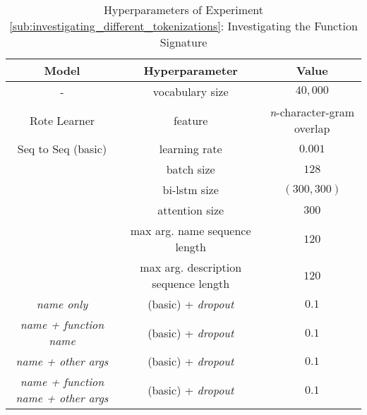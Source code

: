 \begin{table}[h!]
\begin{center}
\begin{tabular}{ c | c | c  }
    \textbf{Model}                           {}  & \textbf{Hyperparameter}  & \textbf{Value}    \\
    \hline
    -                                 & vocabulary size            & $40,000$ \\
    \hline
    Rote Learner                      & feature                    & \textit{n}-character-gram overlap \\
    \hline
    Seq to Seq  (basic)               & learning rate              & $0.001$         \\
                                      & batch size                 & $128$           \\
                                      & bi-lstm size               & $(300,300) $    \\
                                      & attention size             & $300$           \\
                                      & max arg. name sequence length         & $120$   \\
                                      & max arg. description sequence length  & $120$  \\
    \hdashline
    \textit{name only}              & (basic) + \textit{dropout}           & $0.1$           \\
    \textit{name + function name}   & (basic) + \textit{dropout}           & $0.1$           \\
    \textit{name + other args}      & (basic) + \textit{dropout}           & $0.1$           \\
    \textit{name + function name + other args} & (basic) + \textit{dropout}   & $0.1$        \\
\end{tabular}
\caption {Hyperparameters of Experiment \ref{sub:investigating_different_tokenizations}: Investigating the Function Signature }
\label{table:hyperparams_different_tokenizations}
\end{center}
\end{table}


